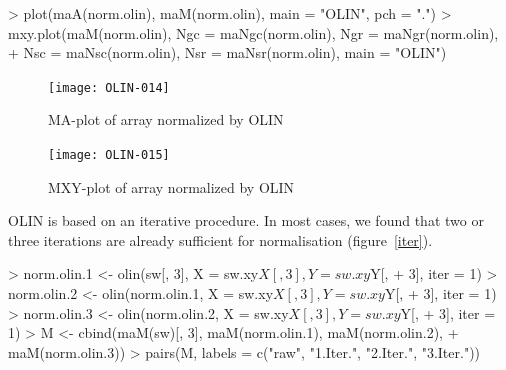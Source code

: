 \documentclass[a4paper,11pt]{article}
\begin{document}
\begin{Schunk}
\begin{Sinput}
> plot(maA(norm.olin), maM(norm.olin), main = "OLIN", pch = ".")
> mxy.plot(maM(norm.olin), Ngc = maNgc(norm.olin), Ngr = maNgr(norm.olin), 
+     Nsc = maNsc(norm.olin), Nsr = maNsr(norm.olin), main = "OLIN")
\end{Sinput}
\end{Schunk}



\begin{figure}[t]
\centering
\texttt{[image: OLIN-014]}
\caption{MA-plot of array normalized by  OLIN }
\label{maolin}
\end{figure}



\begin{figure}
\centering
\texttt{[image: OLIN-015]}
\caption{MXY-plot of array normalized by  OLIN }
\label{mxyolin}
\end{figure}


OLIN is based on an iterative procedure. In most cases, we found
that two or three iterations are already sufficient for normalisation (figure~\ref{iter}).   


\begin{Schunk}
\begin{Sinput}
> norm.olin.1 <- olin(sw[, 3], X = sw.xy$X[, 3], Y = sw.xy$Y[, 
+     3], iter = 1)
> norm.olin.2 <- olin(norm.olin.1, X = sw.xy$X[, 3], Y = sw.xy$Y[, 
+     3], iter = 1)
> norm.olin.3 <- olin(norm.olin.2, X = sw.xy$X[, 3], Y = sw.xy$Y[, 
+     3], iter = 1)
> M <- cbind(maM(sw)[, 3], maM(norm.olin.1), maM(norm.olin.2), 
+     maM(norm.olin.3))
> pairs(M, labels = c("raw", "1.Iter.", "2.Iter.", "3.Iter."))
\end{Sinput}
\end{Schunk}
\end{document}
